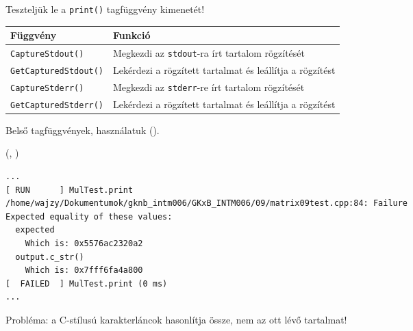 \begin{frame}
  Teszteljük le a \texttt{print()} tagfüggvény kimenetét!
  \vfill
  \begin{tabular}{ll}
    \textbf{Függvény} & \textbf{Funkció}\\ \hline
    \texttt{CaptureStdout()} & Megkezdi az \texttt{stdout}-ra írt tartalom rögzítését\\
    \texttt{GetCapturedStdout()} & Lekérdezi a rögzített tartalmat és leállítja a rögzítést\\
    \texttt{CaptureStderr()} & Megkezdi az \texttt{stderr}-re írt tartalom rögzítését\\
    \texttt{GetCapturedStderr()} & Lekérdezi a rögzített tartalmat és leállítja a rögzítést\\
  \end{tabular}
  \vfill
  Belső tagfüggvények, használatuk  ().
\end{frame}

\begin{frame}
  \begin{exampleblock}{ %
    (, %
     )}
    \small
    
  \end{exampleblock}
\end{frame}

\begin{frame}[fragile]
  \begin{block}{}
    \footnotesize
    \begin{verbatim}
...
[ RUN      ] MulTest.print
/home/wajzy/Dokumentumok/gknb_intm006/GKxB_INTM006/09/matrix09test.cpp:84: Failure
Expected equality of these values:
  expected
    Which is: 0x5576ac2320a2
  output.c_str()
    Which is: 0x7fff6fa4a800
[  FAILED  ] MulTest.print (0 ms)
...
\end{verbatim}
  \end{block}
  \vfill
  Probléma: a C-stílusú karakterláncok  hasonlítja össze, nem az ott lévő tartalmat!
\end{frame}

